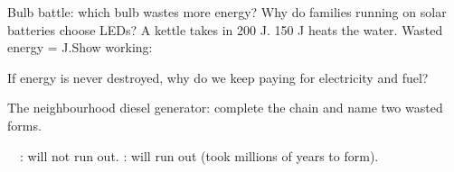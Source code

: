 \documentclass[12pt,a4paper]{article}
\begin{document}
 Bulb battle: which bulb wastes more energy? Why do families running on solar batteries choose LEDs?
 A kettle takes in 200 J. 150 J heats the water. Wasted energy = \blank[2cm] J.\quad Show working: \blank[5cm]
\begin{teaser}
If energy is never destroyed, why do we keep paying for electricity and fuel?
\end{teaser}
 The neighbourhood diesel generator: complete the chain and name two wasted forms.\par\vspace{2pt}

\ \ : will not run out. : will run out (took millions of years to form).
\end{document}
